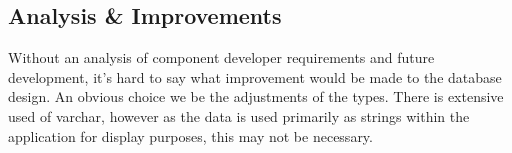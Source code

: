	\subsection{Analysis \& Improvements}
	
		\normalsize
		{
			Without an analysis of component developer requirements and future development, it's hard to say what improvement would be made to the database design.
			An obvious choice we be the adjustments of the types.  There is extensive used of varchar, however as the data
			is used primarily as strings within the application for display purposes, this may not be necessary.
		}
	
